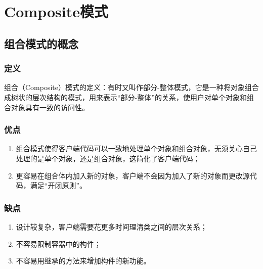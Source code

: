 \chapter{Composite模式}
\section{组合模式的概念}
\subsection{定义}
组合（Composite）模式的定义：有时又叫作部分-整体模式，它是一种将对象组合成树状的层次结构的模式，用来表示“部分-整体”的关系，使用户对单个对象和组合对象具有一致的访问性。
\subsection{优点}
\begin{enumerate}
	\item 组合模式使得客户端代码可以一致地处理单个对象和组合对象，无须关心自己处理的是单个对象，还是组合对象，这简化了客户端代码；
	\item 更容易在组合体内加入新的对象，客户端不会因为加入了新的对象而更改源代码，满足“开闭原则”。
\end{enumerate}
\subsection{缺点}
\begin{enumerate}
	\item 设计较复杂，客户端需要花更多时间理清类之间的层次关系；
	\item 不容易限制容器中的构件；
	\item 不容易用继承的方法来增加构件的新功能。
\end{enumerate}
